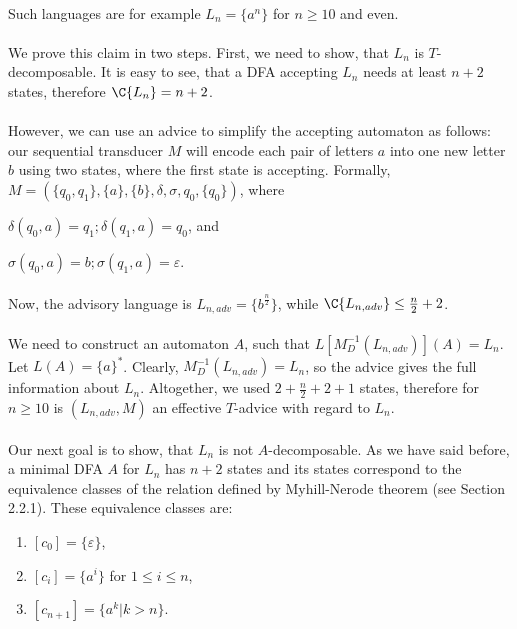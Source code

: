 \paragraph{}
\dokaz Such languages are for example $L_{n} = \{ a^n \}$ for $n \geq 10$ and even.

\paragraph{}
We prove this claim in two steps. First, we need to show, that $L_{n}$ is $T$-decomposable. It is easy to see, that a DFA accepting $L_{n}$ needs at least $n+2$ states, therefore $\C{L_n} = n + 2$.

\paragraph{}
However, we can use an advice to simplify the accepting automaton as follows: our sequential transducer $M$ will encode each pair of letters $a$ into one new letter $b$ using two states, where the first state is accepting. Formally, $M = (\{q_0,q_1\},\{a\},\{b\},\delta,\sigma,q_0,\{q_0\})$, where\\
\centerline{$\delta(q_0,a) = q_1; \delta(q_1,a)=q_0$, and}
\centerline{$\sigma(q_0,a) = b; \sigma(q_1,a) = \varepsilon$.}

\paragraph{}
Now, the advisory language is $L_{n,adv} = \{ b^{\frac{n}{2}} \}$, while $\C{L_{n,adv}} \leq \frac{n}{2} + 2$.

\paragraph{}
We need to construct an automaton $A$, such that $L[M^{-1}_{D}(L_{n,adv})](A) = L_n$. Let $L(A) = \{a\}^*$. Clearly, $M^{-1}_{D}(L_{n,adv}) = L_n$, so the advice gives the full information about $L_n$. Altogether, we used $2 + \frac{n}{2}+2+1$ states, therefore for $n \geq 10$ is $(L_{n,adv}, M)$ an effective $T$-advice with regard to $L_n$.

\paragraph{}
Our next goal is to show, that $L_n$ is not $A$-decomposable. As we have said before, a minimal DFA $A$ for $L_n$ has $n+2$ states and its states correspond to the equivalence classes of the relation defined by Myhill-Nerode theorem (see Section 2.2.1). These equivalence classes are:
\begin{enumerate}
\item $[c_0] = \{ \varepsilon \}$,
\item $[c_{i}] = \{ a^i \}$ for $1 \leq i \leq n$,
\item $[c_{n+1}] = \{ a^k | k > n \}$.
\end{enumerate}


